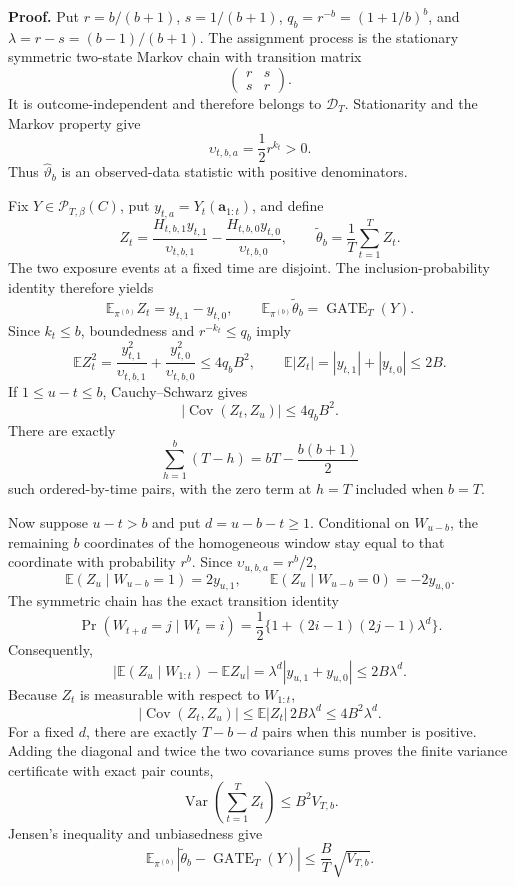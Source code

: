 \textbf{Proof.} Put \(r=b/(b+1)\), \(s=1/(b+1)\), \(q_b=r^{-b}=(1+1/b)^b\), and \(\lambda=r-s=(b-1)/(b+1)\). The assignment process is the stationary symmetric two-state Markov chain with transition matrix
\[
\begin{pmatrix}r&s\\s&r\end{pmatrix}.
\]
It is outcome-independent and therefore belongs to \(\mathcal D_T\). Stationarity and the Markov property give
\[
\upsilon_{t,b,a}=\frac12r^{k_t}>0.
\]
Thus \(\widehat\vartheta_b\) is an observed-data statistic with positive denominators.

Fix \(Y\in\mathcal P_{T,\beta}(C)\), put \(y_{t,a}=Y_t(\mathbf a_{1:t})\), and define
\[
Z_t=\frac{H_{t,b,1}y_{t,1}}{\upsilon_{t,b,1}}-\frac{H_{t,b,0}y_{t,0}}{\upsilon_{t,b,0}},
\qquad
\widetilde\theta_b=\frac1T\sum_{t=1}^T Z_t.
\]
The two exposure events at a fixed time are disjoint. The inclusion-probability identity therefore yields
\[
\mathbb E_{\pi^{(b)}}Z_t=y_{t,1}-y_{t,0},
\qquad
\mathbb E_{\pi^{(b)}}\widetilde\theta_b=\operatorname{GATE}_T(Y).
\]
Since \(k_t\le b\), boundedness and \(r^{-k_t}\le q_b\) imply
\[
\mathbb E Z_t^2
=\frac{y_{t,1}^2}{\upsilon_{t,b,1}}+\frac{y_{t,0}^2}{\upsilon_{t,b,0}}
\le4q_bB^2,
\qquad
\mathbb E|Z_t|=|y_{t,1}|+|y_{t,0}|\le2B.
\]
If \(1\le u-t\le b\), Cauchy--Schwarz gives
\[
|\operatorname{Cov}(Z_t,Z_u)|\le4q_bB^2.
\]
There are exactly
\[
\sum_{h=1}^b(T-h)=bT-\frac{b(b+1)}2
\]
such ordered-by-time pairs, with the zero term at \(h=T\) included when \(b=T\).

Now suppose \(u-t>b\) and put \(d=u-b-t\ge1\). Conditional on \(W_{u-b}\), the remaining \(b\) coordinates of the homogeneous window stay equal to that coordinate with probability \(r^b\). Since \(\upsilon_{u,b,a}=r^b/2\),
\[
\mathbb E(Z_u\mid W_{u-b}=1)=2y_{u,1},
\qquad
\mathbb E(Z_u\mid W_{u-b}=0)=-2y_{u,0}.
\]
The symmetric chain has the exact transition identity
\[
\Pr(W_{t+d}=j\mid W_t=i)
=\frac12\{1+(2i-1)(2j-1)\lambda^d\}.
\]
Consequently,
\[
\left|\mathbb E(Z_u\mid W_{1:t})-\mathbb EZ_u\right|
=\lambda^d|y_{u,1}+y_{u,0}|
\le2B\lambda^d.
\]
Because \(Z_t\) is measurable with respect to \(W_{1:t}\),
\[
|\operatorname{Cov}(Z_t,Z_u)|
\le \mathbb E|Z_t|\,2B\lambda^d
\le4B^2\lambda^d.
\]
For a fixed \(d\), there are exactly \(T-b-d\) pairs when this number is positive. Adding the diagonal and twice the two covariance sums proves the finite variance certificate with exact pair counts,
\[
\operatorname{Var}\left(\sum_{t=1}^TZ_t\right)\le B^2V_{T,b}.
\]
Jensen's inequality and unbiasedness give
\[
\mathbb E_{\pi^{(b)}}\left|\widetilde\theta_b-\operatorname{GATE}_T(Y)\right|
\le\frac BT\sqrt{V_{T,b}}.
\]

